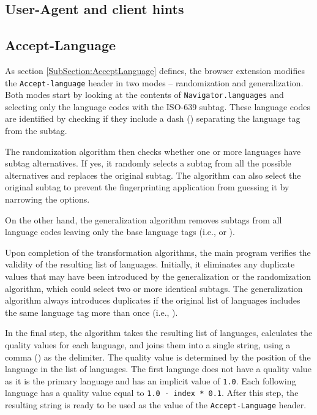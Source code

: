 \subsection{User-Agent and client hints}


\subsection{Accept-Language}

As section \ref{SubSection:AcceptLanguage} defines, the browser extension modifies the \texttt{Accept-language} header in two modes -- randomization and generalization. Both modes start by looking at the contents of \texttt{Navigator.languages} and selecting only the language codes with the ISO-639 subtag. These language codes are identified by checking if they include a dash (\uv{-}) separating the language tag from the subtag.

The randomization algorithm then checks whether one or more languages have subtag alternatives. If yes, it randomly selects a subtag from all the possible alternatives and replaces the original subtag. The algorithm can also select the original subtag to prevent the fingerprinting application from guessing it by narrowing the options.

On the other hand, the generalization algorithm removes subtags from all language codes leaving only the base language tags (i.e.,  or ).

Upon completion of the transformation algorithms, the main program verifies the validity of the resulting list of languages. Initially, it eliminates any duplicate values that may have been introduced by the generalization or the randomization algorithm, which could select two or more identical subtags. The generalization algorithm always introduces duplicates if the original list of languages includes the same language tag more than once (i.e., ).

In the final step, the algorithm takes the resulting list of languages, calculates the quality values for each language, and joins them into a single string, using a comma (\uv{,}) as the delimiter. The quality value is determined by the position of the language in the list of languages. The first language does not have a quality value as it is the primary language and has an implicit value of \texttt{1.0}. Each following language has a quality value equal to \texttt{1.0 - index * 0.1}. After this step, the resulting string is ready to be used as the value of the \texttt{Accept-Language} header.

